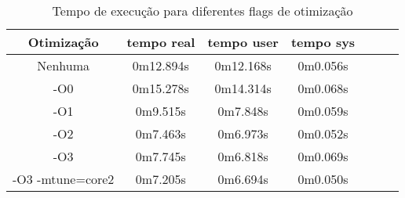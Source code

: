 \documentclass[10pt,a4paper]{article}
\begin{document}
\begin{table}[h!]
  \caption{Tempo de execução para diferentes flags de otimização}
  \begin{center}
    \begin{tabular}{ccccccc}

      Otimização& tempo real& tempo user& tempo sys\\
      \hline 
      Nenhuma  &
      0m12.894s&
      0m12.168s &
      0m0.056s\\
      
      -O0&
      0m15.278s&
      0m14.314s&
      0m0.068s\\

      -O1&
      0m9.515s&
      0m7.848s&
      0m0.059s\\

      -O2&
      0m7.463s&
      0m6.973s&
      0m0.052s\\

      -O3&
      0m7.745s&
      0m6.818s&
      0m0.069s\\

      -O3 -mtune=core2 &
      0m7.205s&
      0m6.694s&
      0m0.050s\\

    \end{tabular}
  \end{center}
\end{table}






\end{document}
